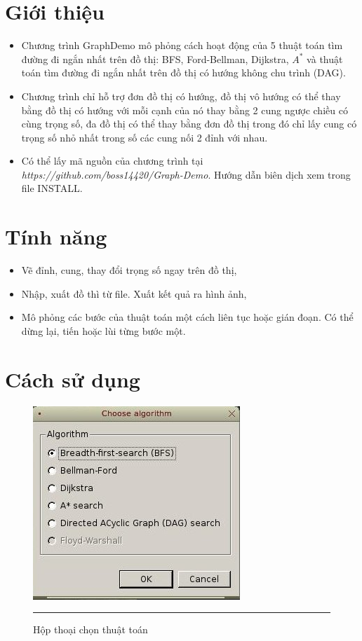 \documentclass[a4paper,12pt]{report}
\begin{document}
\section{Giới thiệu}
\begin{itemize}
    \item Chương trình GraphDemo mô phỏng cách hoạt động của 5 thuật toán tìm đường
    đi ngắn nhất trên đồ thị: BFS, Ford-Bellman, Dijkstra, $A^{*}$ và thuật toán
    tìm đường đi ngắn nhất trên đồ thị có hướng không chu trình (DAG).\\
    \item Chương trình chỉ hỗ trợ đơn đồ thị có hướng, đồ thị vô hướng có thể thay
    bằng đồ thị có hướng với mỗi cạnh của nó thay bằng 2 cung ngược chiều có
    cùng trọng số, đa đồ thị có thể thay bằng đơn đồ thị trong đó chỉ lấy cung
    có trọng số nhỏ nhất trong số các cung nối 2 đỉnh với nhau.\\
    \item Có thể lấy mã nguồn của chương trình tại
        \textit{https://github.com/boss14420/Graph-Demo}. Hướng dẫn biên dịch
        xem trong file INSTALL.
\end{itemize}
\section{Tính năng}
\begin{itemize}
    \item Vẽ đỉnh, cung, thay đổi trọng số ngay trên đồ thị,
    \item Nhập, xuất đồ thì từ file. Xuất kết quả ra hình ảnh,
    \item Mô phỏng các bước của thuật toán một cách liên tục hoặc gián đoạn. Có
        thể dừng lại, tiến hoặc lùi từng bước một.
\end{itemize}
\section{Cách sử dụng}

\begin{figure}
    \centering
    \includegraphics[scale=0.7]{gd1}
    \rule{35em}{0.5pt}
    \caption{Hộp thoại chọn thuật toán}
    \label{fig:AlgorithmChooser}
\end{figure}
\end{document}
